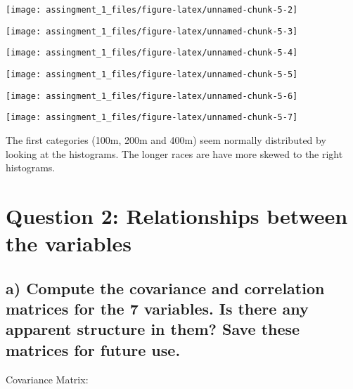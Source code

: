 \documentclass[]{article}
\begin{document}
\begin{center}\texttt{[image: assingment\_1\_files/figure-latex/unnamed-chunk-5-2]} \end{center}

\begin{center}\texttt{[image: assingment\_1\_files/figure-latex/unnamed-chunk-5-3]} \end{center}

\begin{center}\texttt{[image: assingment\_1\_files/figure-latex/unnamed-chunk-5-4]} \end{center}

\begin{center}\texttt{[image: assingment\_1\_files/figure-latex/unnamed-chunk-5-5]} \end{center}

\begin{center}\texttt{[image: assingment\_1\_files/figure-latex/unnamed-chunk-5-6]} \end{center}

\begin{center}\texttt{[image: assingment\_1\_files/figure-latex/unnamed-chunk-5-7]} \end{center}

The first categories (100m, 200m and 400m) seem normally distributed by
looking at the histograms. The longer races are have more skewed to the
right histograms.

\hypertarget{question-2-relationships-between-the-variables}{%
\section{Question 2: Relationships between the
variables}\label{question-2-relationships-between-the-variables}}

\hypertarget{a-compute-the-covariance-and-correlation-matrices-for-the-7-variables.-is-there-any-apparent-structure-in-them-save-these-matrices-for-future-use.}{%
\subsection{a) Compute the covariance and correlation matrices for the 7
variables. Is there any apparent structure in them? Save these matrices
for future
use.}\label{a-compute-the-covariance-and-correlation-matrices-for-the-7-variables.-is-there-any-apparent-structure-in-them-save-these-matrices-for-future-use.}}

Covariance Matrix:
\end{document}
